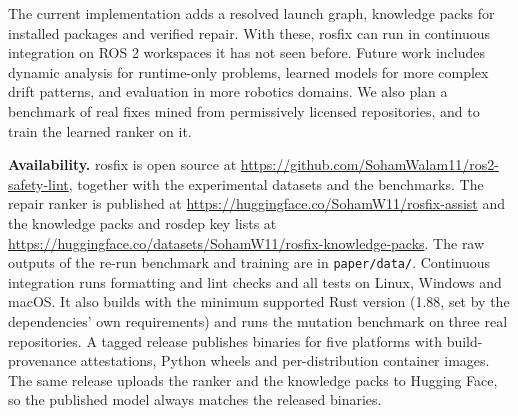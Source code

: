 \documentclass[conference]{IEEEtran}
\newcommand{\code}[1]{\texttt{#1}}
\begin{document}
The current implementation adds a resolved launch graph, knowledge packs for installed packages
and verified repair. With these, rosfix can run in continuous integration on ROS 2 workspaces it
has not seen before. Future work includes dynamic analysis for runtime-only problems, learned models
for more complex drift patterns, and evaluation in more robotics domains. We also plan a
benchmark of real fixes mined from permissively licensed repositories, and to train the learned
ranker on it.

\textbf{Availability.} rosfix is open source at
\url{https://github.com/SohamWalam11/ros2-safety-lint}, together with the experimental datasets
and the benchmarks. The repair ranker is published at
\url{https://huggingface.co/SohamW11/rosfix-assist} and the knowledge packs and rosdep key lists
at \url{https://huggingface.co/datasets/SohamW11/rosfix-knowledge-packs}. The raw outputs of the
re-run benchmark and training are in \code{paper/data/}. Continuous integration runs formatting
and lint checks and all tests on Linux, Windows and macOS. It also builds with the minimum
supported Rust version (1.88, set by the dependencies' own requirements) and runs the mutation
benchmark on three real repositories. A tagged release publishes binaries for five platforms with
build-provenance attestations, Python wheels and per-distribution container images. The same
release uploads the ranker and the knowledge packs to Hugging Face, so the published model always
matches the released binaries.
\end{document}
